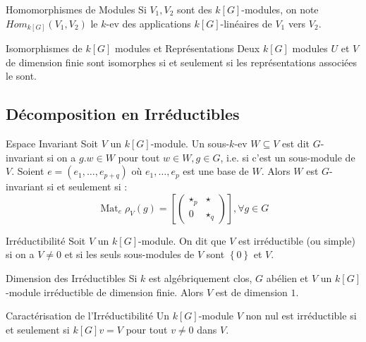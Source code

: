 \documentclass{cours}
\DeclareMathOperator{\Mat}{Mat}
\begin{document}
\begin{définition}{Homomorphismes de Modules}{}
    Si $V_{1}, V_{2}$ sont des $k[G]$-modules, on note $Hom_{k[G]}(V_{1}, V_{2})$ le $k$-ev des applications $k[G]$-linéaires de $V_{1}$ vers $V_{2}$.
\end{définition}

\begin{propositionfr}{Isomorphismes de $k[G]$ modules et Représentations}{}
    Deux $k[G]$ modules $U$ et $V$ de dimension finie sont isomorphes si et seulement si les représentations associées le sont.
\end{propositionfr}

\subsection{Décomposition en Irréductibles}
\begin{définition}{Espace Invariant}{}
    Soit $V$ un $k[G]$-module. Un sous-$k$-ev $W \subseteq V$ est dit $G$-invariant si on a $g.w \in W$ pour tout $w \in W, g \in G$, i.e. si c'est un sous-module de $V$. Soient $e = \left(e_{1}, \ldots, e_{p +q}\right)$ où $e_{1}, \ldots, e_{p}$ est une base de $W$. Alors $W$ est $G$-invariant si et seulement si :
    \[
        \Mat_{e}\rho_{V}(g) = \left[\begin{pmatrix}
                \star_{p} & \star     \\
                0         & \star_{q}
            \end{pmatrix}\right], \forall g \in G
    \]
\end{définition}

\begin{définition}{Irréductibilité}{}
    Soit $V$ un $k[G]$-module. On dit que $V$ est irréductible (ou simple) si on a $V \neq 0$ et si les seuls sous-modules de $V$ sont $\left\{0\right\}$ et $V$.
\end{définition}

\begin{propositionfr}{Dimension des Irréductibles}{}
    Si $k$ est algébriquement clos, $G$ abélien et $V$ un $k[G]$-module irréductible de dimension finie. Alors $V$ est de dimension $1$.
\end{propositionfr}

\begin{propositionfr}{Caractérisation de l'Irréductibilité}{}
    Un $k[G]$-module $V$ non nul est irréductible si et seulement si $k[G]v = V$ pour tout $v \neq 0$ dans $V$.
\end{propositionfr}
\end{document}
